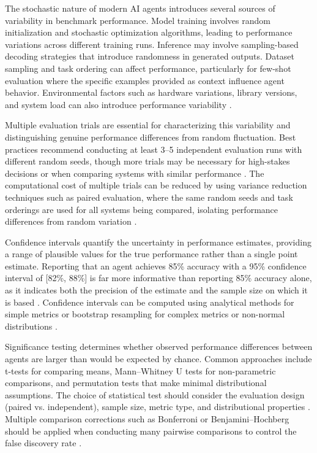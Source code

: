 \begin{TNtwocol}
The stochastic nature of modern AI agents introduces several sources of variability in benchmark performance. Model training involves random initialization and stochastic optimization algorithms, leading to performance variations across different training runs. Inference may involve sampling-based decoding strategies that introduce randomness in generated outputs. Dataset sampling and task ordering can affect performance, particularly for few-shot evaluation where the specific examples provided as context influence agent behavior. Environmental factors such as hardware variations, library versions, and system load can also introduce performance variability \cite{dror2018,reimers2017}.

Multiple evaluation trials are essential for characterizing this variability and distinguishing genuine performance differences from random fluctuation. Best practices recommend conducting at least 3–5 independent evaluation runs with different random seeds, though more trials may be necessary for high-stakes decisions or when comparing systems with similar performance \cite{dror2018,reimers2017}. The computational cost of multiple trials can be reduced by using variance reduction techniques such as paired evaluation, where the same random seeds and task orderings are used for all systems being compared, isolating performance differences from random variation \cite{dror2018}.

Confidence intervals quantify the uncertainty in performance estimates, providing a range of plausible values for the true performance rather than a single point estimate. Reporting that an agent achieves 85\% accuracy with a 95\% confidence interval of [82\%, 88\%] is far more informative than reporting 85\% accuracy alone, as it indicates both the precision of the estimate and the sample size on which it is based \cite{reimers2017,dror2018}. Confidence intervals can be computed using analytical methods for simple metrics or bootstrap resampling for complex metrics or non-normal distributions \cite{dror2018,card2020}.

Significance testing determines whether observed performance differences between agents are larger than would be expected by chance. Common approaches include t-tests for comparing means, Mann–Whitney U tests for non-parametric comparisons, and permutation tests that make minimal distributional assumptions. The choice of statistical test should consider the evaluation design (paired vs. independent), sample size, metric type, and distributional properties \cite{dror2018,card2020}. Multiple comparison corrections such as Bonferroni or Benjamini–Hochberg should be applied when conducting many pairwise comparisons to control the false discovery rate \cite{dror2018,card2020}.


\end{TNtwocol}
